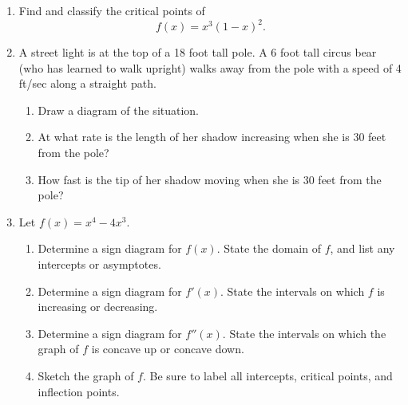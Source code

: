 \documentclass[12pt]{article}
\newcommand{\points}[1]{\marginpar{\hspace{24pt}[#1]}}
\begin{document}
 \begin{enumerate}
 \item  Find and classify the critical points of \points{5}
 \[
 f(x) = x^3(1-x)^2.
 \]
 
 \vspace{7cm}
 
 \item A street light is at the top of a 18 foot tall pole. A 6 foot tall circus bear (who has learned to walk upright) walks away from the pole with a speed of 4 ft/sec along a straight path. 
\begin{enumerate}
\item Draw a diagram of the situation. \points{1}
\item At what rate is the length of her shadow increasing when she is 30 feet from the pole?\points{2}
\item How fast is the tip of her shadow moving when she is 30 feet from the pole? \points{2}
\end{enumerate} 
 \newpage
 
 \item Let $f(x) = x^4-4x^3$.
 \begin{enumerate}
 \item Determine a sign diagram for $f(x)$. \points{2} State the domain of $f$, and list any intercepts or asymptotes.
 \item Determine a sign diagram for $f'(x)$. \points{3} State the intervals on which $f$ is increasing or decreasing.
 \item Determine a sign diagram for $f''(x)$.\points{3} State the intervals on which the graph of $f$ is concave up or concave down.
 \item Sketch the graph of $f$.\points{2} Be sure to label all intercepts, critical points, and inflection points.
 \end{enumerate}
\end{enumerate}
\end{document}
